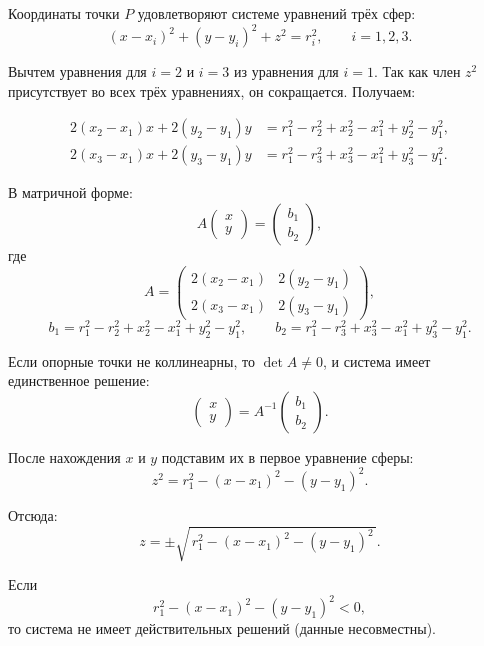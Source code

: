 \documentclass[a4paper,11pt]{article} %
\newcounter{subsubsubsection}[subsubsection]
\begin{document}

Координаты точки \(P\) удовлетворяют системе уравнений трёх сфер:
\[
(x - x_i)^2 + (y - y_i)^2 + z^2 = r_i^2, \qquad i = 1,2,3.
\]


Вычтем уравнения для \(i=2\) и \(i=3\) из уравнения для \(i=1\).  
Так как член \(z^2\) присутствует во всех трёх уравнениях, он сокращается. Получаем:

\begin{align}
2(x_2-x_1)x + 2(y_2-y_1)y &= r_1^2 - r_2^2 + x_2^2 - x_1^2 + y_2^2 - y_1^2, \\
2(x_3-x_1)x + 2(y_3-y_1)y &= r_1^2 - r_3^2 + x_3^2 - x_1^2 + y_3^2 - y_1^2.
\end{align}

В матричной форме:
\[
A
\begin{pmatrix} x \\ y \end{pmatrix}
=
\begin{pmatrix} b_1 \\ b_2 \end{pmatrix},
\]
где
\[
A =
\begin{pmatrix}
2(x_2-x_1) & 2(y_2-y_1) \\
2(x_3-x_1) & 2(y_3-y_1)
\end{pmatrix},
\]
\[
b_1 = r_1^2 - r_2^2 + x_2^2 - x_1^2 + y_2^2 - y_1^2,
\qquad
b_2 = r_1^2 - r_3^2 + x_3^2 - x_1^2 + y_3^2 - y_1^2.
\]

Если опорные точки не коллинеарны, то \(\det A \neq 0\), и система имеет единственное решение:
\[
\begin{pmatrix} x \\ y \end{pmatrix} = A^{-1} \begin{pmatrix} b_1 \\ b_2 \end{pmatrix}.
\]


После нахождения \(x\) и \(y\) подставим их в первое уравнение сферы:
\[
z^2 = r_1^2 - (x - x_1)^2 - (y - y_1)^2.
\]

Отсюда:
\[
z = \pm\sqrt{\,r_1^2 - (x - x_1)^2 - (y - y_1)^2\,}.
\]

Если
\[
r_1^2 - (x - x_1)^2 - (y - y_1)^2 < 0,
\]
то система не имеет действительных решений (данные несовместны).
\end{document}
